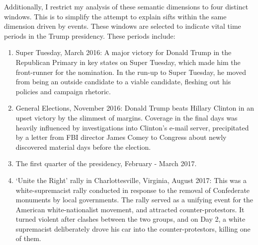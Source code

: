 Additionally, I restrict my analysis of these semantic dimensions to four distinct windows. This is to simplify the attempt to explain sifts within the same dimension driven by events. These windows are selected to indicate vital time periods in the Trump presidency. These periods include:  
\begin{enumerate}
	\item Super Tuesday, March 2016: A major victory for Donald Trump in the Republican Primary in key states on Super Tuesday, which made him the front-runner for the nomination. In the run-up to Super Tuesday, he moved from being an outside candidate to a viable candidate, fleshing out his policies and campaign rhetoric.

	\item General Elections, November 2016: Donald Trump beats Hillary Clinton in an upset victory by the slimmest of margins. Coverage in the final days was heavily influenced by investigations into Clinton's e-mail server, precipitated by a letter from FBI director James Comey to Congress about newly discovered material days before the election. 

	\item The first quarter of the presidency, February - March 2017.  

	\item `Unite the Right' rally in Charlottesville, Virginia, August 2017: This was a white-supremacist rally conducted in response to the removal of Confederate monuments by local governments. The rally served as a unifying event for the American white-nationalist movement, and attracted counter-protestors. It turned violent after clashes between the two groups, and on Day 2, a white supremacist deliberately drove his car into the counter-protestors, killing one of them. 
\end{enumerate}  

\begin{table}[t]
\caption{Antonym pairs used to construct Semantic Dimensions}
\label{tab:dim-table}
\end{table}